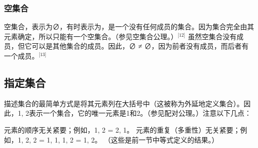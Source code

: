 \subsubsection{空集合}  
空集合，表示为∅，有时表示为{}，是一个没有任何成员的集合。因为集合完全由其元素确定，所以只能有一个空集合。（参见空集合公理。）\(^\text{[12]}\) 虽然空集合没有成员，但它可以是其他集合的成员。因此，∅ ≠ {∅}，因为前者没有成员，而后者有一个成员。\(^\text{[13]}\)
\subsection{指定集合}  
描述集合的最简单方式是将其元素列在大括号中（这被称为外延地定义集合）。因此，{1, 2}表示一个集合，它的唯一元素是1和2。（参见配对公理。）注意以下几点：

元素的顺序无关紧要；例如，{1, 2} = {2, 1}。
元素的重复（多重性）无关紧要；例如，{1, 2, 2} = {1, 1, 1, 2} = {1, 2}。
（这些是前一节中等式定义的结果。）